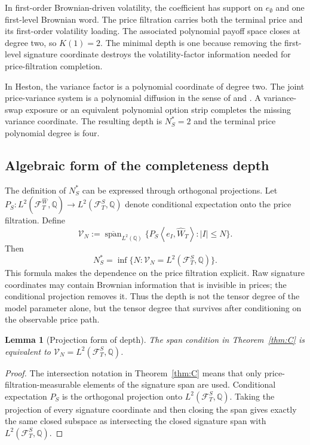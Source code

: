 \documentclass[11pt,oneside]{article}
\theoremstyle{plain}
\newtheorem{lemma}[theorem]{Lemma}
\theoremstyle{definition}
\theoremstyle{remark}
\newcommand{\Q}{\mathbb{Q}}
\newcommand{\cW}{\widehat W}
\newcommand{\FWh}{\mathcal F^{\widehat W}}
\newcommand{\FS}{\mathcal F^S}
\newcommand{\inner}[2]{\left\langle #1,#2\right\rangle}
\newcommand{\clspan}{\overline{\operatorname{span}}}
\begin{document}
In first-order Brownian-driven volatility, the coefficient has support on $e_\emptyset$ and one first-level Brownian word. The price filtration carries both the terminal price and its first-order volatility loading. The associated polynomial payoff space closes at degree two, so $K(1)=2$. The minimal depth is one because removing the first-level signature coordinate destroys the volatility-factor information needed for price-filtration completion.

In Heston, the variance factor is a polynomial coordinate of degree two. The joint price-variance system is a polynomial diffusion in the sense of \citet{CuchieroKellerResselTeichmann2012} and \citet{FilipovicLarsson2016}. A variance-swap exposure or an equivalent polynomial option strip completes the missing variance coordinate. The resulting depth is $N_S^\ast=2$ and the terminal price polynomial degree is four.


\subsection{Algebraic form of the completeness depth}
\label{subsec:algebraic-completeness-depth}
The definition of $N_S^\ast$ can be expressed through orthogonal projections. Let $P_S:L^2(\FWh_T,\Q)\to L^2(\FS_T,\Q)$ denote conditional expectation onto the price filtration. Define
\[
\mathcal V_N:=\clspan_{L^2(\Q)}\{P_S\inner{e_I}{\cW_T}: |I|\leq N\}.
\]
Then
\[
N_S^\ast=\inf\{N:\mathcal V_N=L^2(\FS_T,\Q)\}.
\]
This formula makes the dependence on the price filtration explicit. Raw signature coordinates may contain Brownian information that is invisible in prices; the conditional projection removes it. Thus the depth is not the tensor degree of the model parameter alone, but the tensor degree that survives after conditioning on the observable price path.

\begin{lemma}[Projection form of depth]
\label{lem:projection-form-depth}
The span condition in Theorem~\ref{thm:C} is equivalent to $\mathcal V_N=L^2(\FS_T,\Q)$.
\end{lemma}

\begin{proof}
The intersection notation in Theorem~\ref{thm:C} means that only price-filtration-measurable elements of the signature span are used. Conditional expectation $P_S$ is the orthogonal projection onto $L^2(\FS_T,\Q)$. Taking the projection of every signature coordinate and then closing the span gives exactly the same closed subspace as intersecting the closed signature span with $L^2(\FS_T,\Q)$.
\end{proof}
\end{document}
